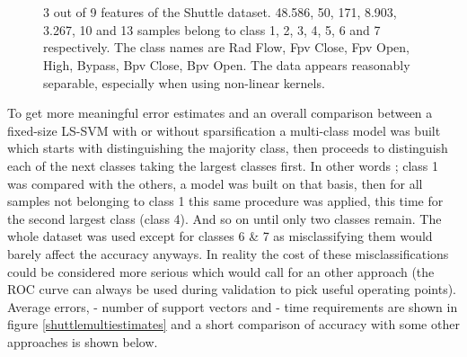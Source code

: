 \vspace{0.5cm}
\begin{figure}[htb]
\centering
%
\\
\\
\caption{3 out of 9 features of the Shuttle dataset. 48.586, 50, 171, 8.903, 3.267, 10 and 13 samples belong to class 1, 2, 3, 4, 5, 6 and 7 respectively. The class names are Rad Flow, Fpv Close, Fpv Open, High, Bypass, Bpv Close, Bpv Open. The data appears reasonably separable, especially when using non-linear kernels.}
\label{shuttlehist}
\end{figure}

To get more meaningful error estimates and an overall comparison between a fixed-size LS-SVM with or without sparsification a multi-class model was built which starts with distinguishing the majority class, then proceeds to distinguish each of the next classes taking the largest classes first. In other words ; class 1 was compared with the others, a model was built on that basis, then for all samples not belonging to class 1 this same procedure was applied, this time for the second largest class (class 4). And so on until only two classes remain. The whole dataset was used except for classes 6 \& 7 as misclassifying them would barely affect the accuracy anyways. In reality the cost of these misclassifications could be considered more serious which would call for an other approach (the ROC curve can always be used during validation to pick useful operating points). Average errors, - number of support vectors and - time requirements are shown in figure \ref{shuttlemultiestimates} and a short comparison of accuracy with some other approaches is shown below.

